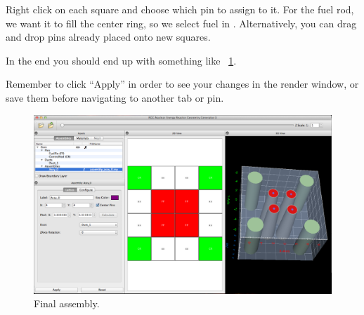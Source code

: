 Right click on each square and choose which pin to assign to it.  For the fuel rod, we want it to fill the center ring, so we select fuel in .  Alternatively, you can drag and drop pins already placed onto new squares.

In the end you should end up with something like ~\ref{fig:Rect10}.

Remember to click ``Apply'' in order to see your changes in the render window, or save them before navigating to another tab or pin.

\begin{figure}[h]
\begin{center}
\includegraphics[width=0.60\linewidth]{Images/rect-final-assy1.png}
\caption{Final assembly.}
\label{fig:Rect10}
\end{center}
\end{figure}

